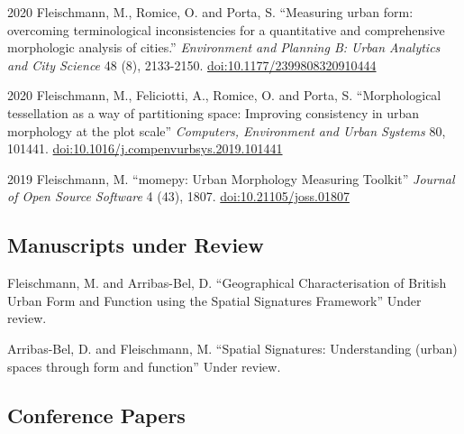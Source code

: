 \documentclass[12pt,a4paper]{report}
\begin{document}
\begin{tablist}
        \item[2020] \tab{}Fleischmann, M., Romice, O. and Porta, S. \enquote{Measuring urban form: overcoming terminological inconsistencies for a quantitative and comprehensive morphologic analysis of cities.} \textit{Environment and Planning B: Urban Analytics and City Science} 48 (8), 2133-2150. \href{https://doi.org/10.1177/2399808320910444}{doi:10.1177/2399808320910444}

        \item[2020] \tab{}Fleischmann, M., Feliciotti, A., Romice, O. and Porta, S. \enquote{Morphological tessellation as a way of partitioning space: Improving consistency in urban morphology at the plot scale} \textit{Computers, Environment and Urban Systems} 80, 101441. \href{https://doi.org/10.1016/j.compenvurbsys.2019.101441}{doi:10.1016/j.compenvurbsys.2019.101441}

        \item[2019] \tab{}Fleischmann, M. \enquote{momepy: Urban Morphology Measuring Toolkit} \textit{Journal of Open Source Software} 4 (43), 1807. \href{https://doi.org/10.21105/joss.01807}{doi:10.21105/joss.01807}


    \end{tablist}

    \subsection*{Manuscripts under Review}

    \begin{tablist}

        \item[\the\year] \tab{}Fleischmann, M. and Arribas-Bel, D. \enquote{Geographical Characterisation of British Urban Form and Function using the Spatial Signatures Framework} Under review.

        \item[\the\year] \tab{}Arribas-Bel, D. and Fleischmann, M. \enquote{Spatial Signatures: Understanding (urban) spaces through form and function} Under review.

    \end{tablist}

    \subsection*{Conference Papers}
\end{document}
